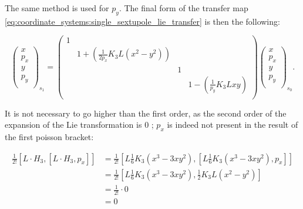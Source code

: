 The same method is used for $p_y$.
The final form of the transfer map \cref{eq:coordinate_systems:single_sextupole_lie_transfer} is
then the following:

\begin{equation}
    \begin{pmatrix}
        x \\
        p_x \\
        y \\
        p_y \\
    \end{pmatrix}_{s_1}
    =
    \begin{pmatrix}
        1 &  &  &  \\
         & 1 + \left(\frac{1}{2 p_x}K_3L(x^2-y^2)\right) &  & \\
         & & 1 & \\
         & &  & 1 - \left(\frac{1}{p_y}K_3Lxy\right)\\ 
    \end{pmatrix}
    \begin{pmatrix}
        x \\
        p_x \\
        y \\
        p_y \\
    \end{pmatrix}_{s_0}.
\end{equation}


It is not necessary to go higher than the first order, as the second order of the expansion of the 
Lie transformation is 0 ; $p_x$ is indeed not present in the result of the first poisson bracket:

\begin{equation}
    \begin{aligned}
    \frac{1}{2!} [L \cdot H_3, [L \cdot H_3, p_x]]
    &= \frac{1}{2!}\left[L \frac{1}{6} K_3 (x^3 - 3xy^2), \left[L \frac{1}{6} K_3 (x^3 - 3xy^2), p_x\right]\right] \\
    &= \frac{1}{2!}\left[L \frac{1}{6} K_3 (x^3 - 3xy^2), \frac{1}{2} K_3 L (x^2 - y^2)\right] \\
    &= \frac{1}{2!} \cdot 0 \\
    &= 0
    \end{aligned}
\end{equation}



\subsection{}

